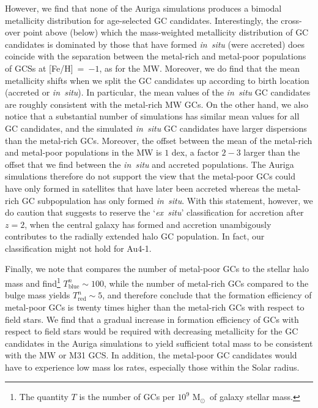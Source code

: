 \documentclass[a4paper,fleqn,usenatbib]{mnras}
\newcommand{\Sun}[0]{\ensuremath{_{\odot}}}
\begin{document}
However, we find that none of the Auriga simulations produces a bimodal 
metallicity distribution for age-selected GC candidates. Interestingly, the 
cross-over point above (below) which the mass-weighted metallicity distribution
of GC candidates is dominated by those that have formed {\it in~situ} (were
accreted) does coincide with the separation between the metal-rich and metal-poor
populations of GCSs at [Fe/H]~=~$-1$, as for the MW. Moreover, we do find 
that the mean metallicity shifts when we split the GC candidates up according 
to birth location (accreted or {\it in~situ}). In particular, the mean values of 
the {\it in~situ} GC candidates are roughly consistent with the metal-rich MW GCs.
On the other hand, we also notice that a substantial number of simulations has similar 
mean values for all GC candidates, and the simulated {\it in~situ} GC candidates 
have larger dispersions than the metal-rich GCs. Moreover, the offset between 
the mean of the metal-rich and metal-poor populations in the MW is $1$ dex, a
factor $2-3$ larger than the offset that we find between the {\it in~situ} and 
accreted populations. The Auriga simulations therefore do not support the view 
that the metal-poor GCs could have only formed in satellites that have later been 
accreted whereas the metal-rich GC subpopulation has only formed {\it in~situ}. 
With this statement, however, we do caution that \citet{2019MNRAS.486.3134K} suggests 
to reserve the `{\it ex~situ}' classification for accretion after $z=2$, when
the central galaxy has formed and accretion unambigously contributes to the
radially extended halo GC population. In fact, our classification might not hold
for Au4-1.

Finally, we note that \citet{2006ARA&A..44..193B} compares the number of metal-poor 
GCs to the stellar halo mass and find\footnote{The quantity $T$ is the number of 
GCs per $10^9$ M\Sun \, of galaxy stellar mass.} $T^n_{\text{blue}} \sim 100$, 
while the number of metal-rich GCs compared to the bulge mass yields 
$T^n_{\text{red}} \sim 5$, and therefore conclude that the formation efficiency
of metal-poor GCs is twenty times higher than the metal-rich GCs with respect to 
field stars. We find that a gradual increase in formation efficiency of GCs
with respect to field stars would be required with decreasing metallicity for
the GC candidates in the Auriga simulations to yield sufficient total mass to
be consistent with the MW or M31 GCS. In addition, the metal-poor GC candidates
would have to experience low mass los rates, especially those within the Solar
radius.
\end{document}
